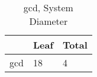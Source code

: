 \begin{table}
\centering
\caption{gcd, System Diameter}
\label{gcd_diam}
\begin{tabular}{lll}
\toprule
{} & Leaf & Total \\
\midrule
gcd &   18 &     4 \\
\bottomrule
\end{tabular}
\end{table}
